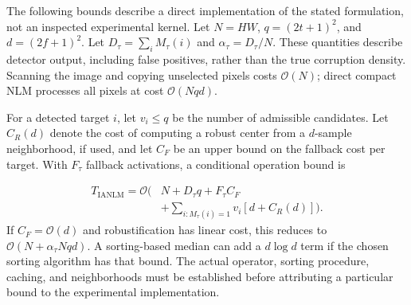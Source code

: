\documentclass[pdflatex,iicol,sn-mathphys-num]{sn-jnl}
\newif\ifshowportuguese
\newcommand{\pt}[1]{\ifshowportuguese\par\begingroup\small\color{blue!55!black}\noindent\textbf{PT: }#1\par\endgroup\fi}
\begin{document}
The following bounds describe a direct implementation of the stated formulation, not an inspected experimental kernel. Let $N=HW$, $q=(2t+1)^2$, and $d=(2f+1)^2$. Let $D_\tau=\sum_i M_\tau(i)$ and $\alpha_\tau=D_\tau/N$. These quantities describe detector output, including false positives, rather than the true corruption density. Scanning the image and copying unselected pixels costs $\mathcal{O}(N)$; direct compact NLM processes all pixels at cost $\mathcal{O}(Nqd)$.
\pt{Os limites a seguir descrevem uma implementação direta da formulação apresentada, não um kernel experimental inspecionado. Sejam $N=HW$, $q=(2t+1)^2$ e $d=(2f+1)^2$. Sejam $D_\tau=\sum_i M_\tau(i)$ e $\alpha_\tau=D_\tau/N$. Essas quantidades descrevem a saída do detector, incluindo falsos positivos, e não a densidade verdadeira de corrupção. Percorrer a imagem e copiar pixels não selecionados custa $\mathcal{O}(N)$; o NLM compacto direto processa todos os pixels ao custo de $\mathcal{O}(Nqd)$.}

For a detected target $i$, let $v_i\leq q$ be the number of admissible candidates. Let $C_R(d)$ denote the cost of computing a robust center from a $d$-sample neighborhood, if used, and let $C_F$ be an upper bound on the fallback cost per target. With $F_\tau$ fallback activations, a conditional operation bound is
\pt{Para um alvo detectado $i$, seja $v_i\leq q$ o número de candidatos admissíveis. Seja $C_R(d)$ o custo de calcular um centro robusto em uma vizinhança de $d$ amostras, quando utilizado, e seja $C_F$ um limite superior para o custo do fallback por alvo. Com $F_\tau$ ativações do fallback, um limite condicional de operações é}
\begin{equation}
\begin{split}
T_{\mathrm{IANLM}}=\mathcal{O}\Big(&N+D_\tau q+F_\tau C_F\\
&+\sum_{i:M_\tau(i)=1}v_i[d+C_R(d)]\Big).
\end{split}
\label{eq:ianlm_complexity_data}
\end{equation}
If $C_F=\mathcal{O}(d)$ and robustification has linear cost, this reduces to $\mathcal{O}(N+\alpha_\tau Nqd)$. A sorting-based median can add a $d\log d$ term if the chosen sorting algorithm has that bound. The actual operator, sorting procedure, caching, and neighborhoods must be established before attributing a particular bound to the experimental implementation.
\pt{Se $C_F=\mathcal{O}(d)$ e a robustificação tem custo linear, essa expressão se reduz a $\mathcal{O}(N+\alpha_\tau Nqd)$. Uma mediana baseada em ordenação pode acrescentar um termo $d\log d$ se o algoritmo de ordenação escolhido tiver esse limite. O operador real, o procedimento de ordenação, o cache e as vizinhanças precisam ser estabelecidos antes de atribuir um limite específico à implementação experimental.}
\end{document}
